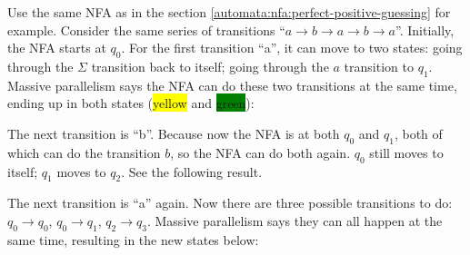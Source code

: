 \documentclass[12pt, letterpaper, oneside]{book}
\begin{document}
Use the same NFA as in the section \ref{automata:nfa:perfect-positive-guessing} for example. Consider the same series
of transitions ``$a \rightarrow b \rightarrow a \rightarrow b \rightarrow a$''. Initially, the NFA starts at $q_0$. For
the first transition ``a'', it can move to two states: going through the $\Sigma$ transition back to itself; going
through the $a$ transition to $q_1$. Massive parallelism says the NFA can do these two transitions at the same time,
ending up in both states (\colorbox{yellow}{yellow} and \colorbox{green}{green}):


The next transition is ``b''. Because now the NFA is at both $q_0$ and $q_1$, both of which can do the transition $b$,
so the NFA can do both again. $q_0$ still moves to itself; $q_1$ moves to $q_2$. See the following result.


The next transition is ``a'' again. Now there are three possible transitions to do: $q_0 \rightarrow q_0$,
$q_0 \rightarrow q_1$, $q_2 \rightarrow q_3$. Massive parallelism says they can all happen at the same time, resulting
in the new states below:
\end{document}
